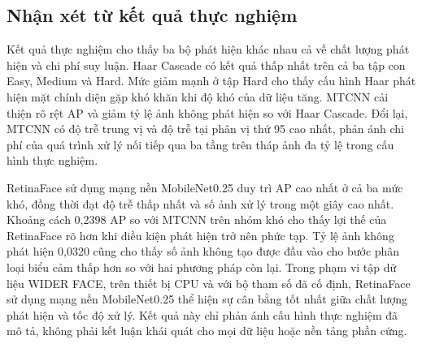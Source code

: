 \documentclass[../LuanVan.tex]{subfiles}
\begin{document}
\begin{table}[H]
    \centering
    \caption{Kết quả hiệu năng phát hiện trên CPU}
    \label{tab:detector_performance}
\end{table}

\subsection{Nhận xét từ kết quả thực nghiệm}
\label{subsection:5.1.3}

Kết quả thực nghiệm cho thấy ba bộ phát hiện khác nhau cả về chất lượng phát hiện và chi phí suy luận. Haar Cascade có kết quả thấp nhất trên cả ba tập con Easy, Medium và Hard. Mức giảm mạnh ở tập Hard cho thấy cấu hình Haar phát hiện mặt chính diện gặp khó khăn khi độ khó của dữ liệu tăng. MTCNN cải thiện rõ rệt AP và giảm tỷ lệ ảnh không phát hiện so với Haar Cascade. Đổi lại, MTCNN có độ trễ trung vị và độ trễ tại phân vị thứ 95 cao nhất, phản ánh chi phí của quá trình xử lý nối tiếp qua ba tầng trên tháp ảnh đa tỷ lệ trong cấu hình thực nghiệm.

RetinaFace sử dụng mạng nền MobileNet0.25 duy trì AP cao nhất ở cả ba mức khó, đồng thời đạt độ trễ thấp nhất và số ảnh xử lý trong một giây cao nhất. Khoảng cách 0,2398 AP so với MTCNN trên nhóm khó cho thấy lợi thế của RetinaFace rõ hơn khi điều kiện phát hiện trở nên phức tạp. Tỷ lệ ảnh không phát hiện 0,0320 cũng cho thấy số ảnh không tạo được đầu vào cho bước phân loại biểu cảm thấp hơn so với hai phương pháp còn lại. Trong phạm vi tập dữ liệu WIDER FACE, trên thiết bị CPU và với bộ tham số đã cố định, RetinaFace sử dụng mạng nền MobileNet0.25 thể hiện sự cân bằng tốt nhất giữa chất lượng phát hiện và tốc độ xử lý. Kết quả này chỉ phản ánh cấu hình thực nghiệm đã mô tả, không phải kết luận khái quát cho mọi dữ liệu hoặc nền tảng phần cứng.
\end{document}
